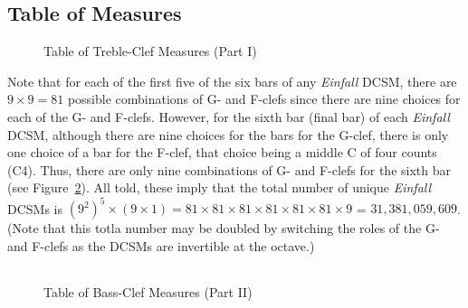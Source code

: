 \documentclass[a4paper,x11names,svgnames,10pt]{article}
\begin{document}
{\subsection{Table of Measures}\label{tabMeas}

\begin{figure}[H]
	\centering
	\def\svgwidth{0.975\columnwidth}
	
	\caption{Table of Treble-Clef Measures (Part I)}
	\label{fig:meas1}
\end{figure}

Note that for each of the first five of the six bars of any {\it Einfall} DCSM, there are $9\times 9 = 81$ possible combinations of G- and F-clefs since there are nine choices for each of the G- and F-clefs. However, for the sixth bar (final bar) of each {\it Einfall } DCSM, although there are nine choices for the bars for the G-clef, there is only one choice of a bar for the F-clef, that choice being a middle C of four counts (C4). Thus, there are only nine combinations of G- and F-clefs for the sixth bar (see Figure~\ref{fig:meas2}). All told, these imply that the total number of unique {\it Einfall} DCSMs is $(9^2)^5 \times (9\times 1) = 81\times 81 \times 81 \times 81 \times 81\times 81 \times 9$ = $31,\!381,\!059,\!609$. (Note that this totla number may be doubled by switching the roles of the G- and F-clefs as the DCSMs are invertible at the octave.)

${}_{}$\\
\vspace{0.10in}
\begin{figure}[H]
	\centering
	\def\svgwidth{0.975\columnwidth}
	
	\caption{Table of Bass-Clef Measures (Part II)}
	\label{fig:meas2}
\end{figure}

%	

}
\end{document}
